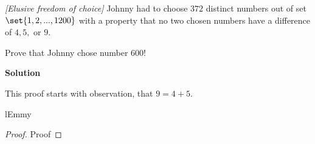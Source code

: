 \begin{problem}
\textit{[Elusive freedom of choice]}
Johnny had to choose $372$ distinct numbers out of set $\set{1,2,...,1200}$ with a property that no two chosen numbers have a difference of $4,5,$ or $9$. 

Prove that Johnny chose number $600$! 

\textbf{Solution}

This proof starts with observation, that $9=4+5$. 
\begin{lemma}
lEmmy
\end{lemma}
\begin{proof}
Proof
\end{proof}

\end{problem}
%

%
%
%
%
%
%
%
%
%
%
%

